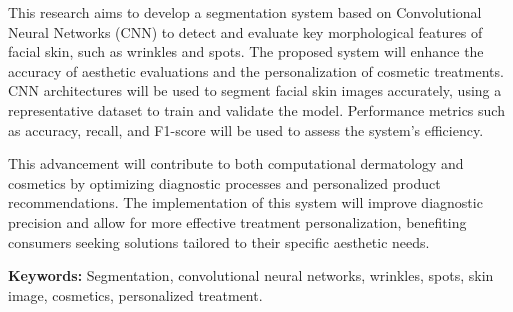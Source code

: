 This research aims to develop a segmentation system based on Convolutional Neural Networks (CNN) to detect and evaluate key morphological features of facial skin, such as wrinkles and spots. The proposed system will enhance the accuracy of aesthetic evaluations and the personalization of cosmetic treatments. CNN architectures will be used to segment facial skin images accurately, using a representative dataset to train and validate the model. Performance metrics such as accuracy, recall, and F1-score will be used to assess the system's efficiency.

This advancement will contribute to both computational dermatology and cosmetics by optimizing diagnostic processes and personalized product recommendations. The implementation of this system will improve diagnostic precision and allow for more effective treatment personalization, benefiting consumers seeking solutions tailored to their specific aesthetic needs.

\textbf{Keywords:} Segmentation, convolutional neural networks, wrinkles, spots, skin image, cosmetics, personalized treatment.
